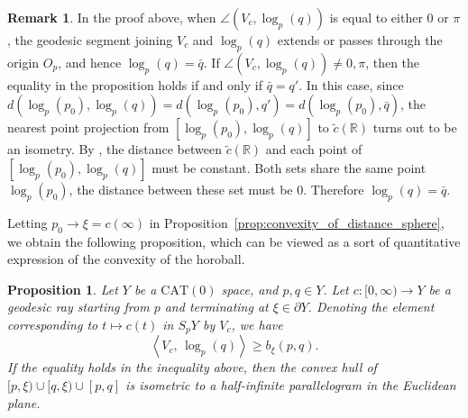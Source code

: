\documentclass[12pt]{amsart}
\numberwithin{equation}{section}
\theoremstyle{plain}
\newtheorem{Proposition}[Theorem]{Proposition}
\theoremstyle{definition}
\newtheorem{Remark}[Theorem]{Remark}
\theoremstyle{remark}
\newcommand{\R}{{\mathbb R}}
\newcommand{\tcprj}{\log}
\newcommand{\inner}[2]{\left\langle #1,\, #2 \right\rangle}
\newcommand{\cat}[1]{\mathrm{CAT}(#1)}
\begin{document}
\begin{Remark}
\label{rem:equality_for_distance_ball}
 In the proof above, when $\angle (V_c, \tcprj_p(q))$ is equal to either
 $0$ or $\pi$, the geodesic
 segment joining $V_c$ and $\tcprj_p(q)$ extends or passes through the
 origin $O_p$, and hence $\tcprj_p(q)=\bar q$. 
 If $\angle (V_c, \tcprj_p(q))\not=0, \pi$, then the equality in the
 proposition holds if and only if $\bar q=q'$. 
 In this case, since 
 $d(\tcprj_p(p_0), \tcprj_p(q))=d(\tcprj_p(p_0),q')=d(\tcprj_p(p_0),\bar q)$, 
 the nearest point projection from $[\tcprj_p(p_0),\tcprj_p(q)]$ to 
 $\tilde c(\R)$ turns out to be an isometry. 
 By \cite[p.~182, 2.12(3)]{bridson-haefliger}, 
 the distance between $\tilde c(\R)$ and each point of 
 $[\tcprj_p(p_0),\tcprj_p(q)]$ must be constant. 
 Both sets share the same point $\tcprj_p(p_0)$, the distance between these
 set must be $0$.  Therefore $\tcprj_p(q)=\bar q$. 
\end{Remark}

%
%
Letting $p_0\to \xi=c(\infty)$ in 
Proposition~\ref{prop:convexity_of_distance_sphere}, we obtain the
following proposition, which can be viewed as a sort of
quantitative expression of the convexity of the horoball.

\begin{Proposition}
\label{prop:convexity_of_horosphere} 
 Let $Y$ be a $\cat{0}$ space, and $p, q \in Y$. 
 Let $c\colon [0,\infty)\longrightarrow Y$ be a geodesic ray starting
 from $p$ and terminating at $\xi \in \partial Y$. 
 Denoting the element corresponding to $t \mapsto c(t)$ in $S_pY$ by 
 $V_c$, we have
\begin{equation*}
   \inner{V_c}{\tcprj_p(q)}
   \geq b_{\xi}(p,q). 
\end{equation*}
 If the equality holds in the inequality above, then the convex hull of 
 $[p, \xi)\cup [q, \xi)\cup [p, q]$ is 
 isometric to a half-infinite parallelogram in the Euclidean plane.
\end{Proposition}
\end{document}
